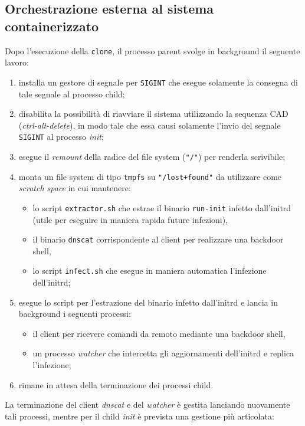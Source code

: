 \documentclass{article}
\begin{document}
\subsection{Orchestrazione esterna al sistema containerizzato}
Dopo l'esecuzione della \texttt{clone}, il processo parent svolge in background il seguente lavoro:
\begin{enumerate}
	\item installa un gestore di segnale per \texttt{SIGINT} che esegue solamente la consegna di tale segnale al processo child;
	\item disabilita la possibilità di riavviare il sistema utilizzando la sequenza CAD (\textsl{ctrl-alt-delete}), in modo tale che essa causi solamente l'invio del segnale \texttt{SIGINT} al processo \textsl{init};
	\item esegue il \textsl{remount} della radice del file system (\texttt{"/"}) per renderla scrivibile;
	\item monta un file system di tipo \texttt{tmpfs} su \texttt{"/lost+found"} da utilizzare come \textsl{scratch space} in cui mantenere:
	\begin{itemize}
		\item lo script \texttt{extractor.sh} che estrae il binario \texttt{run-init} infetto dall'initrd (utile per eseguire in maniera rapida future infezioni),
		\item il binario \texttt{dnscat} corrispondente al client per realizzare una backdoor shell,
		\item lo script \texttt{infect.sh} che esegue in maniera automatica l'infezione dell'initrd;
	\end{itemize}
	\item esegue lo script per l'estrazione del binario infetto dall'initrd e lancia in background i seguenti processi:
	\begin{itemize}
		\item il client per ricevere comandi da remoto mediante una backdoor shell,
		\item un processo \textsl{watcher} che intercetta gli aggiornamenti dell'initrd e replica l'infezione;
	\end{itemize}
	\item rimane in attesa della terminazione dei processi child.
\end{enumerate}
La terminazione del client \textsl{dnscat} e del \textsl{watcher} è gestita lanciando nuovamente tali processi, mentre per il child \textsl{init} è prevista una gestione più articolata:
\end{document}
